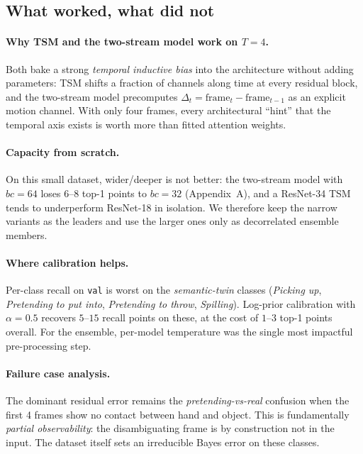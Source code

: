 \documentclass[10pt,twocolumn,letterpaper]{article}
\begin{document}
\subsection{What worked, what did not}
\label{sec:failures}

\paragraph{Why TSM and the two-stream model work on $T=4$.}
Both bake a strong \emph{temporal inductive bias} into the architecture
without adding parameters: TSM shifts a fraction of channels along time
at every residual block, and the two-stream model precomputes
$\Delta_t = \text{frame}_t - \text{frame}_{t-1}$ as an explicit motion
channel. With only four frames, every architectural ``hint'' that the
temporal axis exists is worth more than fitted attention weights.

\paragraph{Capacity from scratch.}
On this small dataset, wider/deeper is not better: the two-stream model
with $bc{=}64$ loses $6$--$8$ top-1 points to $bc{=}32$
(Appendix~A), and a ResNet-34 TSM tends to underperform ResNet-18 in
isolation. We therefore keep the narrow variants as the leaders and use
the larger ones only as decorrelated ensemble members.

\paragraph{Where calibration helps.}
Per-class recall on \texttt{val} is worst on the \emph{semantic-twin}
classes (\emph{Picking up}, \emph{Pretending to put into},
\emph{Pretending to throw}, \emph{Spilling}). Log-prior calibration with
$\alpha=0.5$ recovers $5$--$15$ recall points on these, at the cost of
$1$--$3$ top-1 points overall. For the ensemble, per-model temperature
was the single most impactful pre-processing step.

\paragraph{Failure case analysis.}
The dominant residual error remains the \emph{pretending-vs-real}
confusion when the first 4 frames show no contact between hand and
object. This is fundamentally \emph{partial observability}: the
disambiguating frame is by construction not in the input. The dataset
itself sets an irreducible Bayes error on these classes.
\end{document}
